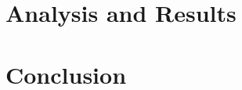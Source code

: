 \documentclass[12pt, twocolumn]{article}
\begin{document}
	\section{Analysis and Results}
	
		
	\section{Conclusion}


	
	
	
	
\end{document}
